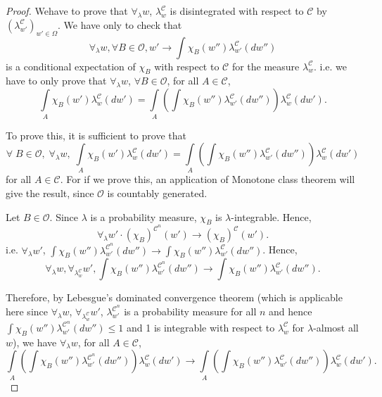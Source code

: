 \begin{proof}
We\pageoriginale have to prove that $\forall_\lambda w$,
$\lambda^\mathscr{C}_w$ is disintegrated with respect to $\mathscr{C}$
by $(\lambda^\mathscr{C}_{w'})_{w' \in \Omega}$. We have only to check
that 
$$
\forall_\lambda w, \forall B \in \mathscr{O}, w' \to \int \chi_B
(w'') \lambda^\mathscr{C}_{w'} (dw'')
$$
is a conditional expectation of $\chi_B$ with respect to $\mathscr{C}$
for the measure $\lambda^\mathscr{C}_w$. i.e. we have to only prove
that $\forall_\lambda w$, $\forall B \in \mathscr{O}$, for all $A \in
\mathscr{C}$,
$$
\int\limits_A \chi_B (w') \lambda^\mathscr{C}_w(dw') = \int\limits_A
(\int \chi_B(w'')\lambda^\mathscr{C}_{w'} (dw''))
\lambda^\mathscr{C}_w (dw'). 
$$

To prove this, it is sufficient to prove that 
$$
\forall \; B \in \mathscr{O}, \; \forall_\lambda w, \; \int\limits_A
\chi_B (w') \lambda^\mathscr{C}_w(dw') = \int\limits_A (\int\chi_B
(w'') \lambda^\mathscr{C}_{w'} (dw''))  \lambda^\mathscr{C}_w(dw')
$$
for all $A \in \mathscr{C}$. For if we prove this, an application of
Monotone class theorem will give the result, since $\mathscr{O}$ is
countably generated.

Let $B \in \mathscr{O}$. Since $\lambda$ is a probability measure,
$\chi_B$ is $\lambda$-integrable. Hence,
$$
\forall_\lambda w' \cdot (\chi_B)^{\mathscr{C}^n} (w') \to
(\chi_B)^{\mathscr{C}}  (w'). 
$$
i.e. $\forall_\lambda w'$, $\int \chi_B (w'')
\lambda^{\mathscr{C}^n}_{w'} (dw'') \to \int \chi_B (w'')
\lambda^\mathscr{C}_{w'} (dw'')$. Hence,
$$
\forall_\lambda w, \forall_{\lambda^\mathscr{C}_w} w', \int \chi_B
(w'') \lambda^{\mathscr{C}^n}_{w'} (dw'') \to \int \chi_B (w'')
\lambda^\mathscr{C}_{w'} (dw''). 
$$

Therefore, by Lebesgue's dominated convergence theorem (which is
applicable here since $\forall_\lambda w$,
$\forall_{\lambda^\mathscr{C}_w} w'$, $\lambda^{\mathscr{C}^n}_{w'}$
is a probability measure for all $n$ and hence $\int \chi_B (w'')
\lambda^{ \mathscr{C}^n}_{w'} (dw'') \leq 1$ and 1 is integrable with
respect to $\lambda^\mathscr{C}_w$ for $\lambda$-almost all $w$), we
have $\forall_\lambda w$, for all $A \in \mathscr{C}$, 
$$
\int\limits_A (\int \chi_B (w'') \lambda^{\mathscr{C}^n}_{w'} (dw''))
\lambda^\mathscr{C}_w (dw') \to \int\limits_A (\int \chi_B (w'')
\lambda^\mathscr{C}_{w'} (dw'')) \lambda^\mathscr{C}_w(dw'). 
$$


\end{proof}
